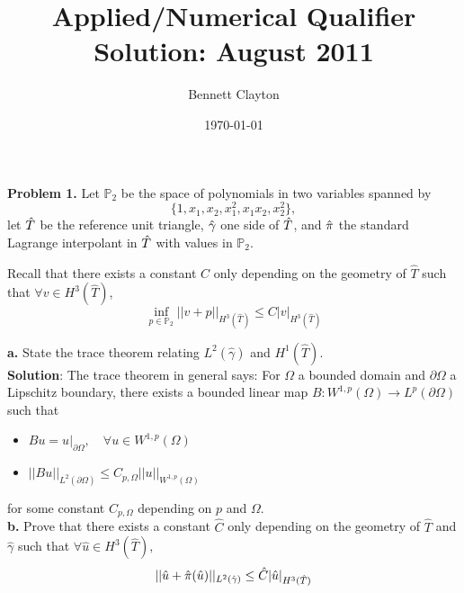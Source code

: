 \documentclass[11pt]{article}
\title{Applied/Numerical Qualifier Solution: August 2011}
\author{Bennett Clayton}
\affil{Texas A\&M University}
\date{\today}
\begin{document}
\maketitle

{\bf Problem 1.} Let $\mathbb{P}_2$ be the space of polynomials in two variables spanned by 
\begin{equation}
    \{1, x_1, x_2, x_1^2, x_1x_2, x_2^2\},
\end{equation}
let $\Hat{T}$ be the reference unit triangle, $\Hat{\gamma}$ one side of $\Hat{T}$, and $\Hat{\pi}$ the standard Lagrange interpolant in $\Hat{T}$ with values in $\mathbb{P}_2$. 

Recall that there exists a constant $C$ only depending on the geometry of $\hat{T}$ such that $\forall v \in H^3(\hat{T})$, 
\begin{equation}
    \inf_{p\in\mathbb{P}_2} ||v + p ||_{H^3(\hat{T})} \leq C |v|_{H^3(\hat{T})}
\end{equation}

\vskip 1cm

{\bf a.} State the trace theorem relating $L^2(\hat{\gamma})$ and $H^1(\hat{T})$.
\\[8pt]

{\bf Solution}: The trace theorem in general says: For $\Omega$ a bounded domain and $\partial\Omega$ a Lipschitz boundary, there exists a bounded linear map $B : W^{1,p}(\Omega) \to L^p(\partial\Omega)$ such that 
\begin{itemize}
\item $Bu = u|_{\partial\Omega}, \quad \forall u \in W^{1,p}(\Omega)$ \\
\item $||Bu||_{L^2(\partial\Omega)} \leq C_{p,\Omega} ||u||_{W^{1,p}(\Omega)} $
\end{itemize}
for some constant $C_{p,\Omega}$ depending on $p$ and $\Omega$. 
\\[16pt]



{\bf b.} Prove that there exists a constant $\hat{C}$ only depending on the geometry of $\hat{T}$ and $\hat{\gamma}$ such that $\forall \hat{u}\in H^3(\hat{T}),$
\begin{equation}
   ||\Hat{u} + \Hat{\pi}(\Hat{u})||_{L^2(\Hat{\gamma})} \leq \hat{C}|\hat{u}|_{H^3(\hat{T})}
\end{equation}

\vskip 1cm
\end{document}
